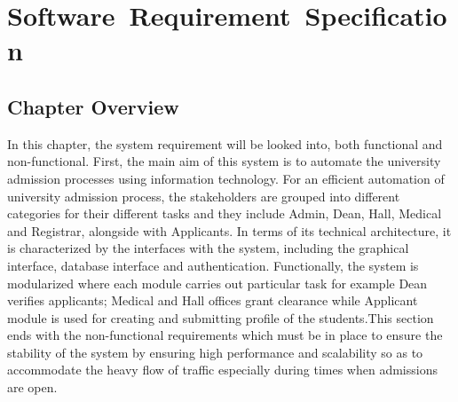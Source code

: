 \chapter{\mbox{Software Requirement Specification}}
\label{ch:srs}

\section{Chapter Overview}

In this chapter, the system requirement will be looked into, both functional and non-functional. First, the main aim of this system is to automate the university admission processes using information technology. For an efficient automation of university admission process, the stakeholders are grouped into different categories for their different tasks and they include Admin, Dean, Hall, Medical and Registrar, alongside with Applicants. In terms of its technical architecture, it is characterized by the interfaces with the system, including the graphical interface, database interface and authentication. Functionally, the system is modularized where each module carries out particular task for example Dean verifies applicants; Medical and Hall offices grant clearance while Applicant module is used for creating and submitting profile of the students.This section ends with the non-functional requirements which must be in place to ensure the stability of the system by ensuring high performance and scalability so as to accommodate the heavy flow of traffic especially during times when admissions are open. 


\setlength{\parindent}{0pt}
\setlength{\parskip}{1em} 














